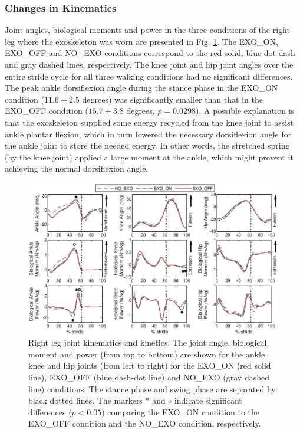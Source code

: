 \documentclass[10pt]{asme2ej}
\begin{document}
\subsubsection{Changes in Kinematics}
Joint angles, biological moments and power in the three conditions of the right leg where the exoskeleton was worn are presented in Fig. \ref{fig:kinetics_r}.
The EXO\_ON, EXO\_OFF and NO\_EXO conditions correspond to the red solid, blue dot-dash and gray dashed lines, respectively.
The knee joint and hip joint angles over the entire stride cycle for all three walking conditions had no significant differences.
The peak ankle dorsiflexion angle during the stance phase in the EXO\_ON condition ($11.6\pm2.5$ degrees) was significantly smaller than that in the EXO\_OFF condition ($15.7\pm3.8$ degrees, $p=0.0298$).
A possible explanation is that the exoskeleton supplied some energy recycled from the knee joint to assist ankle plantar flexion, which in turn lowered the necessary dorsiflexion angle for the ankle joint to store the needed energy.
In other words, the stretched spring (by the knee joint) applied a large moment at the ankle, which might prevent it achieving the normal dorsiflexion angle.

\begin{figure}[th]
	\centering
	\includegraphics[width=17cm]{compare.eps}
	\caption{Right leg joint kinematics and kinetics.
		The joint angle, biological moment and power (from top to bottom) are shown for the ankle, knee and hip joints (from left to right) for the EXO\_ON (red solid line), EXO\_OFF (blue dash-dot line) and NO\_EXO (gray dashed line) conditions.
		The stance phase and swing phase are separated by black dotted lines.
		The markers $*$ and $\circ$ indicate significant differences ($p<0.05$) comparing the EXO\_ON condition to the EXO\_OFF condition and the NO\_EXO condition, respectively.}
	\label{fig:kinetics_r}
\end{figure}
\end{document}
